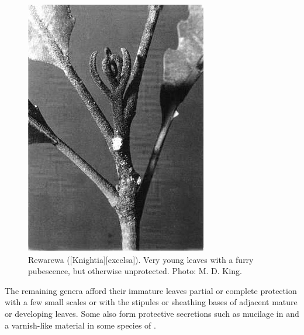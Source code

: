 \begin{figure}[t]
\begin{minipage}[t]{\textwidth}
\begin{minipage}[t]{(\textwidth-\fgap) * \real{0.323}}
			\includegraphics[width=\textwidth]{graphics/figure25rewarewa.jpg}
			\caption[Rewarewa leaves]{Rewarewa ([Knightia][excelsa]).
			Very young leaves with a furry pubescence, but otherwise unprotected.
			Photo: M. D. King.}%
			\label{fig:25rewarewa}
		\end{minipage}
	\end{minipage}
\end{figure}

The remaining genera afford their immature leaves partial or complete protection with a few small scales or with the stipules or sheathing bases of adjacent mature or developing leaves.
Some also form protective secretions such as mucilage in  and a varnish-like material in some species of .

